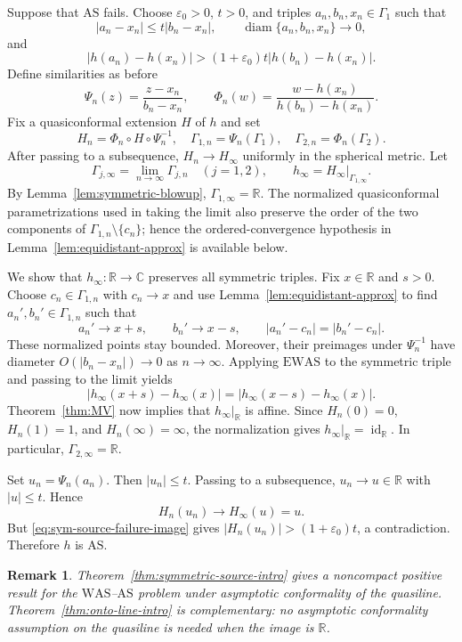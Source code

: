 \documentclass[10pt,a4paper]{amsart}
\numberwithin{equation}{section}
\newtheorem*{remark}{Remark} %
\newcommand{\R}{\mathbb{R}}
\newcommand{\C}{\mathbb{C}}
\newcommand{\diam}{\operatorname{diam}}
\newcommand{\id}{\operatorname{id}}
\begin{document}
\medskip

Suppose that $\mathrm{AS}$ fails.  
Choose $\varepsilon_0>0$, $t>0$, and triples $a_n,b_n,x_n\in\Gamma_1$ such that
\begin{equation*}
 |a_n-x_n|\leq t|b_n-x_n|,\qquad \diam\{a_n,b_n,x_n\}\to0,
\end{equation*}
and
\begin{equation}\label{eq:sym-source-failure-image}
 |h(a_n)-h(x_n)|>(1+\varepsilon_0)t|h(b_n)-h(x_n)|.
\end{equation}
Define similarities as before
\[
 \Psi_n(z)=\frac{z-x_n}{b_n-x_n},
 \qquad
 \Phi_n(w)=\frac{w-h(x_n)}{h(b_n)-h(x_n)}.
\]
Fix a quasiconformal extension $H$ of $h$ and set
\[
 H_n=\Phi_n\circ H\circ \Psi_n^{-1},
 \quad
 \Gamma_{1,n}=\Psi_n(\Gamma_1),
 \quad
 \Gamma_{2,n}=\Phi_n(\Gamma_2).
\]
After passing to a subsequence, $H_n\to H_\infty$ uniformly in the spherical metric.  
Let
\[
 \Gamma_{j,\infty}=\lim_{n \to \infty}\Gamma_{j,n} \quad (j=1,2),\qquad  h_\infty=H_\infty|_{\Gamma_{1,\infty}}.
\]
By Lemma~\ref{lem:symmetric-blowup}, $\Gamma_{1,\infty}=\R$.
The normalized quasiconformal parametrizations used in taking the limit also preserve the order of the two components of $\Gamma_{1,n}\setminus\{c_n\}$; hence the ordered-convergence hypothesis in
Lemma~\ref{lem:equidistant-approx} is available below.

We show that $h_\infty\colon\R\to\C$ preserves all symmetric  triples.  
Fix $x\in\R$ and $s>0$.  
Choose $c_n\in\Gamma_{1,n}$ with $c_n\to x$ and use Lemma~\ref{lem:equidistant-approx} to find $a_n',b_n'\in\Gamma_{1,n}$ such that
\[
 a_n'\to x+s,\qquad b_n'\to x-s,\qquad |a_n'-c_n|=|b_n'-c_n|.
\]
These normalized points stay bounded. Moreover, their preimages under $\Psi_n^{-1}$ have diameter $O(|b_n-x_n|)\to0$
as $n \to \infty$.  
Applying $\mathrm{EWAS}$ to the symmetric  triple and passing to the limit yields
\[
 |h_\infty(x+s)-h_\infty(x)|=|h_\infty(x-s)-h_\infty(x)|.
\]
Theorem~\ref{thm:MV} now implies that $h_\infty|_{\mathbb{R}}$ is affine. 
Since $H_n(0)=0$, $H_n(1)=1$, and $H_n(\infty)=\infty$, the normalization gives $h_\infty|_{\mathbb{R}}=\id_{\R}$.
In particular, $\Gamma_{2,\infty}=\R$.

Set $u_n=\Psi_n(a_n)$.
Then $|u_n|\leq t$.  
Passing to a subsequence, $u_n\to u\in\R$ with $|u|\leq t$.  
Hence
\[
 H_n(u_n)\to  H_\infty(u)=u.
\]
But \eqref{eq:sym-source-failure-image} gives $|H_n(u_n)|>(1+\varepsilon_0)t$,
a contradiction.  
Therefore $h$ is $\mathrm{AS}$.


\begin{remark}
Theorem~\ref{thm:symmetric-source-intro} gives a noncompact positive result for the $\mathrm{WAS}$--$\mathrm{AS}$ problem under asymptotic conformality of the quasiline.
Theorem~\ref{thm:onto-line-intro} is complementary: no asymptotic conformality assumption on the quasiline is needed when the image is $\mathbb{R}$.
\end{remark}
\end{document}
